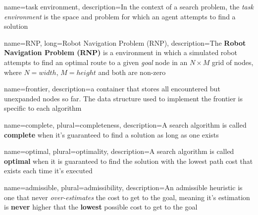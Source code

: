 {
	name={task environment},
	description={In the context of a search problem, the \textit{task environment} is the space and problem for which an agent attempts to find a solution}
}

{
	name={RNP},
	long={Robot Navigation Problem (RNP)},
	description={The \textbf{Robot Navigation Problem (RNP)} is a \Gls{environment} in which a simulated robot attempts to find an optimal route to a given \textit{goal} \gls{node} in an $N \times M$ grid of nodes, where $N=width$, $M=height$ and both are non-zero}
}

{
	name=frontier,
	description={a container that stores all encountered but unexpanded nodes so far. The data structure used to implement the frontier is specific to each algorithm}
}

{
	name=complete,
	plural=completeness,
	description={A search algorithm is called \textbf{complete} when it's guaranteed to find a solution as long as one exists}
}

{
	name=optimal,
	plural=optimality,
	description={A search algorithm is called \textbf{optimal} when it is guaranteed to find the solution with the lowest path cost that exists each time it's executed}
}

{
	name=admissible,
	plural=admissibility,
	description={An admissible heuristic is one that never \textit{over-estimates} the cost to get to the goal, meaning it's estimation is \textbf{never} higher that the \textbf{lowest} possible cost to get to the goal}
}
